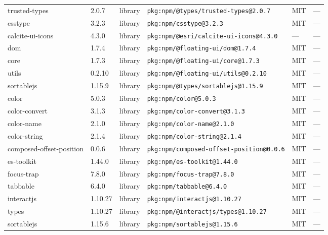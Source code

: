 \documentclass[11pt,a4paper]{article}
\begin{document}
\begin{longtable}{|p{4cm}|p{2cm}|p{1.6cm}|p{5cm}|p{1.5cm}|p{3.5cm}|}
\raggedright trusted-types & 2.0.7 & library & \small\texttt{pkg:npm/@types/trusted-types@2.0.7} & MIT & \small — \\
\raggedright csstype & 3.2.3 & library & \small\texttt{pkg:npm/csstype@3.2.3} & MIT & \small — \\
\raggedright calcite-ui-icons & 4.3.0 & library & \small\texttt{pkg:npm/@esri/calcite-ui-icons@4.3.0} & — & \small — \\
\raggedright dom & 1.7.4 & library & \small\texttt{pkg:npm/@floating-ui/dom@1.7.4} & MIT & \small — \\
\raggedright core & 1.7.3 & library & \small\texttt{pkg:npm/@floating-ui/core@1.7.3} & MIT & \small — \\
\raggedright utils & 0.2.10 & library & \small\texttt{pkg:npm/@floating-ui/utils@0.2.10} & MIT & \small — \\
\raggedright sortablejs & 1.15.9 & library & \small\texttt{pkg:npm/@types/sortablejs@1.15.9} & MIT & \small — \\
\raggedright color & 5.0.3 & library & \small\texttt{pkg:npm/color@5.0.3} & MIT & \small — \\
\raggedright color-convert & 3.1.3 & library & \small\texttt{pkg:npm/color-convert@3.1.3} & MIT & \small — \\
\raggedright color-name & 2.1.0 & library & \small\texttt{pkg:npm/color-name@2.1.0} & MIT & \small — \\
\raggedright color-string & 2.1.4 & library & \small\texttt{pkg:npm/color-string@2.1.4} & MIT & \small — \\
\raggedright composed-offset-position & 0.0.6 & library & \small\texttt{pkg:npm/composed-offset-position@0.0.6} & MIT & \small — \\
\raggedright es-toolkit & 1.44.0 & library & \small\texttt{pkg:npm/es-toolkit@1.44.0} & MIT & \small — \\
\raggedright focus-trap & 7.8.0 & library & \small\texttt{pkg:npm/focus-trap@7.8.0} & MIT & \small — \\
\raggedright tabbable & 6.4.0 & library & \small\texttt{pkg:npm/tabbable@6.4.0} & MIT & \small — \\
\raggedright interactjs & 1.10.27 & library & \small\texttt{pkg:npm/interactjs@1.10.27} & MIT & \small — \\
\raggedright types & 1.10.27 & library & \small\texttt{pkg:npm/@interactjs/types@1.10.27} & MIT & \small — \\
\raggedright sortablejs & 1.15.6 & library & \small\texttt{pkg:npm/sortablejs@1.15.6} & MIT & \small — \\

\end{longtable}
\end{document}
